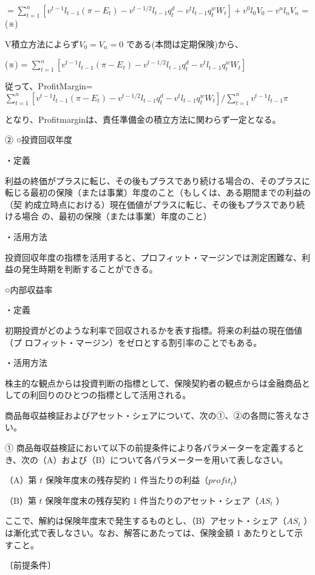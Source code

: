 \documentclass[report,gutter=10mm,fore-edge=10mm,uplatex,dvipdfmx]{jlreq}
\begin{document}
$= \sum^n_{t=1}[v^{t-1}l_{t-1}(\pi-E_t)-v^{t-1/2}l_{t-1}q_t^d-v^tl_{t-1}q_t^wW_t] + v^0l_0V_0 - v^nl_nV_n$  = (※)

V積立方法によらず$V_0=V_n=0$ である(本問は定期保険)から、

(※) = $ \sum^n_{t=1}[v^{t-1}l_{t-1}(\pi-E_t)-v^{t-1/2}l_{t-1}q_t^d-v^tl_{t-1}q_t^wW_t]$

従って、ProfitMargin= $ \sum^n_{t=1}[v^{t-1}l_{t-1}(\pi-E_t)-v^{t-1/2}l_{t-1}q_t^d-v^tl_{t-1}q_t^wW_t] / \sum^n_{t=1}v^{t-1}l_{t-1}\pi$

となり、Profitmarginは、責任準備金の積立方法に関わらず一定となる。

②
○投資回収年度

・定義

利益の終価がプラスに転じ、その後もプラスであり続ける場合の、そのプラスに
転じる最初の保険（または事業）年度のこと（もしくは、ある期間までの利益の（契
約成立時点における）現在価値がプラスに転じ、その後もプラスであり続ける場合
の、最初の保険（または事業）年度のこと）

・活用方法

投資回収年度の指標を活用すると、プロフィット・マージンでは測定困難な、利
益の発生時期を判断することができる。

○内部収益率

・定義

初期投資がどのような利率で回収されるかを表す指標。将来の利益の現在価値（プ
ロフィット・マージン）をゼロとする割引率のことでもある。

・活用方法

株主的な観点からは投資判断の指標として、保険契約者の観点からは金融商品と
しての利回りのひとつの指標として活用される。


商品毎収益検証およびアセット・シェアについて、次の①、②の各問に答えなさい。

① 商品毎収益検証において以下の前提条件により各パラメーターを定義するとき、次の（A）および（B）について各パラメーターを用いて表しなさい。

（A）第 $t$ 保険年度末の残存契約 1 件当たりの利益（$profit_t$）

（B）第 $t$ 保険年度末の残存契約 1 件当たりのアセット・シェア（$AS_t$ ）

ここで、解約は保険年度末で発生するものとし、（B）アセット・シェア（$AS_t$ ）は漸化式で表しなさい。なお、解答にあたっては、保険金額 1 あたりとして示すこと。

〔前提条件〕
\end{document}
